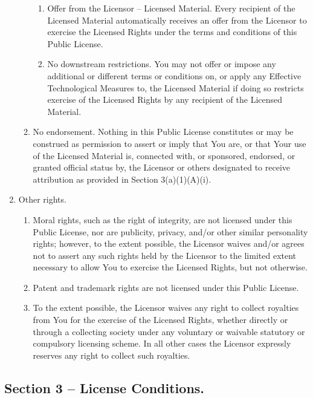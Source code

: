 \begin{enumerate}
\begin{enumerate}
    \begin{enumerate}
    \item
      Offer from the Licensor -- Licensed Material.
      Every recipient of
      the Licensed Material automatically receives an offer from the
      Licensor to exercise the Licensed Rights under the terms and
      conditions of this Public License.
    \item
      No downstream restrictions.
      You may not offer or impose any
      additional or different terms or conditions on, or apply any
      Effective Technological Measures to, the Licensed Material if
      doing so restricts exercise of the Licensed Rights by any
      recipient of the Licensed Material.
    \end{enumerate}
  \item
    No endorsement.
    Nothing in this Public License constitutes or may be
    construed as permission to assert or imply that You are, or that
    Your use of the Licensed Material is, connected with, or sponsored,
    endorsed, or granted official status by, the Licensor or others
    designated to receive attribution as provided in Section
    3(a)(1)(A)(i).
  \end{enumerate}
\item
  Other rights.

  \begin{enumerate}
  \item
    Moral rights, such as the right of integrity, are not licensed under
    this Public License, nor are publicity, privacy, and/or other
    similar personality rights;
    however, to the extent possible, the
    Licensor waives and/or agrees not to assert any such rights held by
    the Licensor to the limited extent necessary to allow You to
    exercise the Licensed Rights, but not otherwise.
  \item
    Patent and trademark rights are not licensed under this Public
    License.
  \item
    To the extent possible, the Licensor waives any right to collect
    royalties from You for the exercise of the Licensed Rights, whether
    directly or through a collecting society under any voluntary or
    waivable statutory or compulsory licensing scheme.
    In all other
    cases the Licensor expressly reserves any right to collect such
    royalties.
  \end{enumerate}
\end{enumerate}

\subsection*{Section 3 -- License Conditions.}

